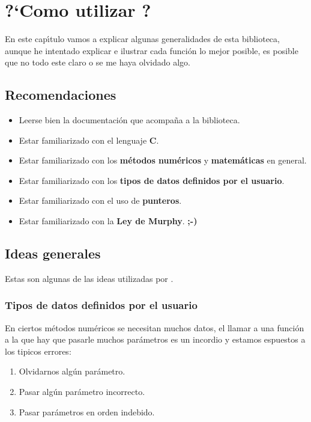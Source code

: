 \chapter{?`Como utilizar \BI?}

En este cap\'{\i}tulo vamos a explicar algunas generalidades de esta 
biblioteca, aunque he intentado explicar e ilustrar cada funci\'on lo mejor
posible, es posible que no todo este claro o se me haya olvidado algo.\\

\section{Recomendaciones}

\begin{itemize}
\item Leerse bien la documentaci\'on que acompa\~na a la biblioteca.
\item Estar familiarizado con el lenguaje \textbf{C}.
\item Estar familiarizado con los \textbf{m\'etodos num\'ericos} y 
\textbf{matem\'aticas} en general.
\item Estar familiarizado con los \textbf{tipos de datos definidos por el
usuario}.
\item Estar familiarizado con el uso de \textbf{punteros}.
\item Estar familiarizado con la \textbf{Ley de Murphy}. \textbf{;-)}
\end{itemize}

\section{Ideas generales}

Estas son algunas de las ideas utilizadas por \BI.

\newpage

\subsection{Tipos de datos definidos por el usuario}

En ciertos m\'etodos num\'ericos se necesitan muchos datos, el llamar a una
funci\'on a la que hay que pasarle muchos par\'ametros es un incordio y estamos
espuestos a los tipicos errores:

\begin{enumerate}
\item Olvidarnos alg\'un par\'ametro.
\item Pasar alg\'un par\'ametro incorrecto.
\item Pasar par\'ametros en orden indebido.
\end{enumerate}

